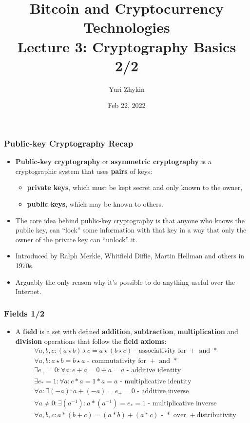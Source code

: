 \documentclass{beamer}
\title{
  Bitcoin and Cryptocurrency Technologies \\
  Lecture 3: Cryptography Basics 2/2
}
\author{Yuri Zhykin}
\date{Feb 22, 2022}
\begin{document}
\frame{\titlepage}

\begin{frame}
  \frametitle{Public-key Cryptography Recap}
  \begin{itemize}
  \item \textbf{Public-key cryptography} or \textbf{asymmetric cryptography} is
    a cryptographic system that uses \textbf{pairs} of keys:
    \begin{itemize}
    \item \textbf{private keys}, which must be kept secret and only known to the
      owner,
    \item \textbf{public keys}, which may be known to others.
    \end{itemize}
  \item The core idea behind public-key cryptography is that anyone who knows
    the public key, can ``lock'' some information with that key in a way that
    only the owner of the private key can ``unlock'' it.
  \item Introduced by Ralph Merkle, Whitfield Diffie, Martin Hellman and others
    in 1970s.
  \item Arguably the only reason why it's possible to do anything useful over
    the Internet.
  \end{itemize}
\end{frame}

\begin{frame}
  \frametitle{Fields 1/2}
  \begin{itemize}
  \item A \textbf{field} is a set with defined \textbf{addition},
    \textbf{subtraction}, \textbf{multiplication} and \textbf{division}
    operations that follow the \textbf{field axioms}:
    \begin{align*}
      &\forall a, b, c: (a \star b) \star c = a \star (b \star c) \text{ -
        associativity for $+$ and $*$} \\
      &\forall a, b: a \star b = b \star a \text{ - commutativity for $+$ and
        $*$} \\
      &\exists e_+ = 0: \forall a: e + a = 0 + a = a \text{ - additive identity}
      \\
      &\exists e_* = 1: \forall a: e * a = 1 * a = a \text{ - multiplicative
        identity} \\
      &\forall a: \exists (-a): a + (-a) = e_+ = 0 \text{ - additive inverse} \\
      &\forall a \neq 0: \exists (a^{-1}): a * (a^{-1}) = e_* = 1 \text{ -
        multiplicative inverse} \\
      &\forall a, b, c: a*(b+c) = (a*b) + (a*c) \text{ - $*$ over $+$
        distributivity} \\
    \end{align*}
  \end{itemize}
\end{frame}
\end{document}
